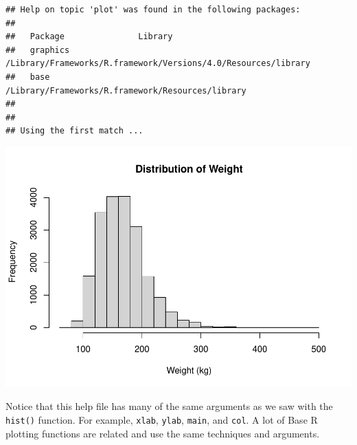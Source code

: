 \documentclass[
]{book}
\newenvironment{Shaded}{\begin{snugshade}}{\end{snugshade}}
\newcommand{\CommentTok}[1]{\textcolor[rgb]{0.56,0.35,0.01}{\textit{#1}}}
\newcommand{\DataTypeTok}[1]{\textcolor[rgb]{0.13,0.29,0.53}{#1}}
\newcommand{\KeywordTok}[1]{\textcolor[rgb]{0.13,0.29,0.53}{\textbf{#1}}}
\newcommand{\NormalTok}[1]{#1}
\newcommand{\OperatorTok}[1]{\textcolor[rgb]{0.81,0.36,0.00}{\textbf{#1}}}
\newcommand{\StringTok}[1]{\textcolor[rgb]{0.31,0.60,0.02}{#1}}
\begin{document}
\begin{verbatim}
## Help on topic 'plot' was found in the following packages:
## 
##   Package               Library
##   graphics              /Library/Frameworks/R.framework/Versions/4.0/Resources/library
##   base                  /Library/Frameworks/R.framework/Resources/library
## 
## 
## Using the first match ...
\end{verbatim}

\begin{Shaded}
\end{Shaded}

\includegraphics{_main_files/figure-latex/unnamed-chunk-232-1.pdf}

Notice that this help file has many of the same arguments as we saw with the \texttt{hist()} function. For example, \texttt{xlab}, \texttt{ylab}, \texttt{main}, and \texttt{col}. A lot of Base R plotting functions are related and use the same techniques and arguments.

\begin{Shaded}
\end{Shaded}
\end{document}
